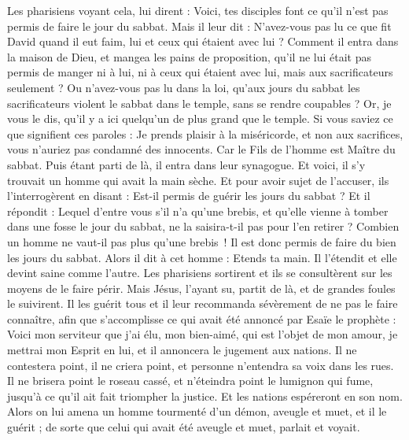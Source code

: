 \begin{multicols}{2}
{Les pharisiens voyant cela, lui dirent : Voici, tes disciples font ce qu'il n'est pas permis de faire le jour du sabbat.
Mais il leur dit : N'avez-vous pas lu ce que fit David quand il eut faim, lui et ceux qui étaient avec lui ?
Comment il entra dans la maison de Dieu, et mangea les pains de proposition, qu’il ne lui était pas permis de manger ni à lui, ni à ceux qui étaient avec lui, mais aux sacrificateurs seulement ?
Ou n'avez-vous pas lu dans la loi, qu'aux jours du sabbat les sacrificateurs violent le sabbat dans le temple, sans se rendre coupables ?
Or, je vous le dis, qu'il y a ici quelqu'un de plus grand que le temple.
Si vous saviez ce que signifient ces paroles : Je prends plaisir à la miséricorde, et non aux sacrifices, vous n'auriez pas condamné des innocents{}.
Car le Fils de l'homme est Maître du sabbat.
Puis étant parti de là, il entra dans leur synagogue.
Et voici, il s’y trouvait un homme qui avait la main sèche. Et pour avoir sujet de l'accuser, ils l'interrogèrent en disant : Est-il permis de guérir les jours du sabbat ?
Et il répondit : Lequel d’entre vous s'il n’a qu’une brebis, et qu'elle vienne à tomber dans une fosse le jour du sabbat, ne la saisira-t-il pas pour l’en retirer ?
Combien un homme ne vaut-il pas plus qu'une brebis ! Il est donc permis de faire du bien les jours du sabbat.
Alors il dit à cet homme : Etends ta main. Il l'étendit et elle devint saine comme l'autre.
Les pharisiens sortirent et ils se consultèrent sur les moyens de le faire périr.
Mais Jésus, l’ayant su, partit de là, et de grandes foules le suivirent. Il les guérit tous
et il leur recommanda sévèrement de ne pas le faire connaître,
afin que s’accomplisse ce qui avait été annoncé par Esaïe le prophète :
Voici mon serviteur que j'ai élu, mon bien-aimé, qui est l'objet de mon amour, je mettrai mon Esprit en lui, et il annoncera le jugement aux nations.
Il ne contestera point, il ne criera point, et personne n'entendra sa voix dans les rues.
Il ne brisera point le roseau cassé, et n'éteindra point le lumignon qui fume, jusqu'à ce qu'il ait fait triompher la justice.
Et les nations espéreront en son nom{}.
Alors on lui amena un homme tourmenté d'un démon, aveugle et muet, et il le guérit ; de sorte que celui qui avait été aveugle et muet, parlait et voyait.
}
\end{multicols}
